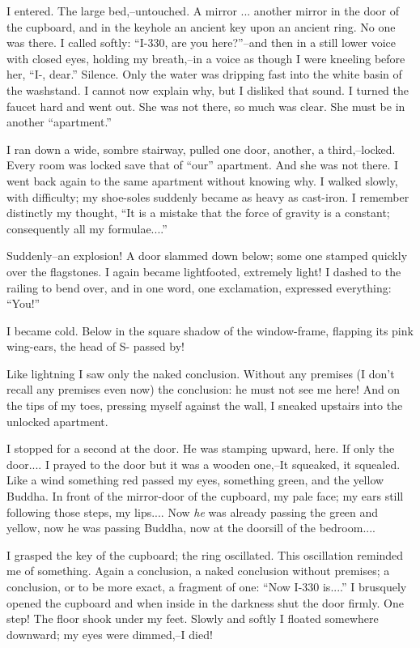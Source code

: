 \documentclass[11pt,openany]{book}
\begin{document}
I entered. The large bed,--untouched. A mirror ... another mirror in the door of the cupboard, and in the keyhole an ancient key upon an ancient ring. No one was there. I called softly: ``I-330, are you here?''--and then in a still lower voice with closed eyes, holding my breath,--in a voice as though I were kneeling before her, ``I-, dear.'' Silence. Only the water was dripping fast into the white basin of the washstand. I cannot now explain why, but I disliked that sound. I turned the faucet hard and went out. She was not there, so much was clear. She must be in another ``apartment.''

I ran down a wide, sombre stairway, pulled one door, another, a third,--locked. Every room was locked save that of ``our'' apartment. And she was not there. I went back again to the same apartment without knowing why. I walked slowly, with difficulty; my shoe-soles suddenly became as heavy as cast-iron. I remember distinctly my thought, ``It is a mistake that the force of gravity is a constant; consequently all my formulae....''

Suddenly--an explosion! A door slammed down below; some one stamped quickly over the flagstones. I again became lightfooted, extremely light! I dashed to the railing to bend over, and in one word, one exclamation, expressed everything: ``You!''

I became cold. Below in the square shadow of the window-frame, flapping its pink wing-ears, the head of S- passed by!

Like lightning I saw only the naked conclusion. Without any premises (I don't recall any premises even now) the conclusion: he must not see me here! And on the tips of my toes, pressing myself against the wall, I sneaked upstairs into the unlocked apartment.

I stopped for a second at the door. He was stamping upward, here. If only the door.... I prayed to the door but it was a wooden one,--It squeaked, it squealed. Like a wind something red passed my eyes, something green, and the yellow Buddha. In front of the mirror-door of the cupboard, my pale face; my ears still following those steps, my lips.... Now \emph{he} was already passing the green and yellow, now he was passing Buddha, now at the doorsill of the bedroom....

I grasped the key of the cupboard; the ring oscillated. This oscillation reminded me of something. Again a conclusion, a naked conclusion without premises; a conclusion, or to be more exact, a fragment of one: ``Now I-330 is....'' I brusquely opened the cupboard and when inside in the darkness shut the door firmly. One step! The floor shook under my feet. Slowly and softly I floated somewhere downward; my eyes were dimmed,--I died!
\end{document}

